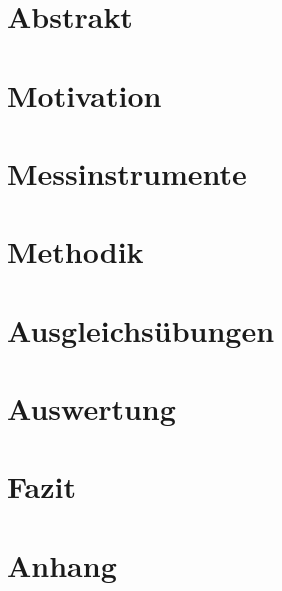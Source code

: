 





\setcounter{page}{2}

\section*{\centering Abstrakt}

\clearpage



\tableofcontents %
\clearpage

\listoffigures
\listoftables
\clearpage

\setcounter{section}{0}



\section{Motivation}


\section{Messinstrumente}


\section{Methodik}

\section{Ausgleichsübungen}


\section{Auswertung}

\section{Fazit}


\clearpage
{}
\printbibliography

\clearpage
{}
\appendix

\section*{Anhang}
% 


